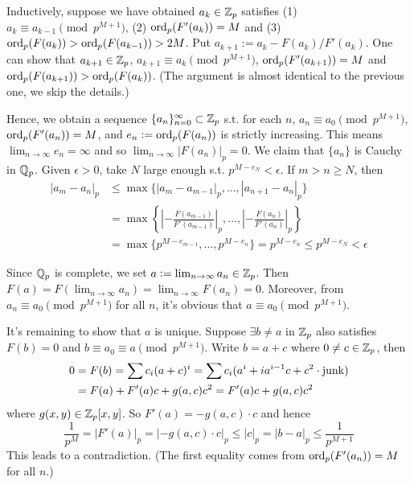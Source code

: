 \documentclass[../Koblitz.tex]{subfiles}
\begin{document}
Inductively, suppose we have obtained $a_k\in\mathbb{Z}_p$ satisfies (1) $a_k\equiv a_{k-1} \pmod{p^{M+1}}$, (2) $\operatorname{ord}_p(F'(a_k))=M$ and (3) $\operatorname{ord}_p(F(a_k))>\operatorname{ord}_p(F(a_{k-1}))>2M$. Put $a_{k+1}:=a_k-F(a_k)/F'(a_k)$. One can show that $a_{k+1}\in\mathbb{Z}_p$, $a_{k+1}\equiv a_k \pmod{p^{M+1}}$, $\operatorname{ord}_p(F'(a_{k+1}))=M$ and $\operatorname{ord}_p(F(a_{k+1})) > \operatorname{ord}_p(F(a_k))$. (The argument is almost identical to the previous one, we skip the details.)

Hence, we obtain a sequence $\{a_n\}_{n=0}^\infty\subset\mathbb{Z}_p$ s.t. for each $n$, $a_n\equiv a_0 \pmod{p^{M+1}}$, $\operatorname{ord}_p(F'(a_n))=M$, and $e_n:=\operatorname{ord}_p(F(a_n))$ is strictly increasing.
This means $\lim_{n\to\infty} e_n=\infty$ and so $\lim_{n\to\infty} |F(a_n)|_p=0$. We claim that $\{a_n\}$ is Cauchy in $\mathbb{Q}_p$. Given $\epsilon>0$, take $N$ large enough s.t. $p^{M-e_N}<\epsilon$. If $m>n\geq N$, then
\begin{align*}
|a_m-a_n|_p &\leq \max\{|a_m-a_{m-1}|_p,\ldots,|a_{n+1}-a_n|_p\} \\
&= \max\left\{ \left|-\frac{F(a_{m-1})}{F'(a_{m-1})}\right|_p ,\ldots, \left|-\frac{F(a_n)}{F'(a_n)}\right|_p \right\} \\
&= \max\{ p^{M-e_{m-1}},\ldots,p^{M-e_n} \} = p^{M-e_n} \leq p^{M-e_N} < \epsilon
\end{align*}

Since $\mathbb{Q}_p$ is complete, we set $a:=\lim_{n\to\infty}a_n\in\mathbb{Z}_p$. Then $F(a)=F\left(\lim_{n\to\infty} a_n\right) = \lim_{n\to\infty} F(a_n) = 0$. Moreover, from $a_n\equiv a_0 \pmod{p^{M+1}}$ for all $n$, it's obvious that $a\equiv a_0 \pmod{p^{M+1}}$.

It's remaining to show that $a$ is unique. Suppose $\exists b\neq a$ in $\mathbb{Z}_p$ also satisfies $F(b)=0$ and $b\equiv a_0\equiv a\pmod{p^{M+1}}$. Write $b=a+c$ where $0\neq c\in\mathbb{Z}_p$, then
\begin{align*}
0 &= F(b) = \sum c_i(a+c)^i = \sum c_i(a^i + ia^{i-1}c + c^2 \cdot\operatorname{junk}) \\
&= F(a) + F'(a)c + g(a,c)c^2 = F'(a)c + g(a,c)c^2
\end{align*}
where $g(x,y)\in\mathbb{Z}_p[x,y]$. So $F'(a)=-g(a,c)\cdot c$ and hence $$\frac{1}{p^M} = \left|F'(a)\right|_p = |-g(a,c)\cdot c|_p \leq |c|_p = |b-a|_p \leq \frac{1}{p^{M+1}}$$ This leads to a contradiction. (The first equality comes from $\operatorname{ord}_p(F'(a_n))=M$ for all $n$.)
\end{document}
